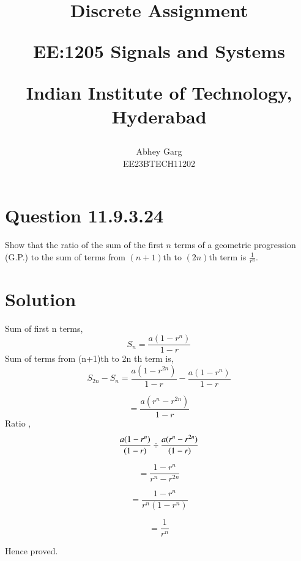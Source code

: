 \documentclass[journal,12pt,twocolumn]{IEEEtran}
\theoremstyle{remark}
\begin{document}
%




\vspace{3cm}

\title{
Discrete Assignment 

\large{EE:1205 Signals and Systems}

Indian Institute of Technology, Hyderabad
}
\author{Abhey Garg

EE23BTECH11202
}	


\maketitle

\newpage


\bigskip

\renewcommand{\thefigure}{\theenumi}
\renewcommand{\thetable}{\theenumi}

\section{Question 11.9.3.24}
Show that the ratio of the sum of the first \(n\) terms of a geometric progression (G.P.) to the sum of terms from \((n+1)\)th to \((2n)\)th term is \(\frac{1}{r^n}\).
\section{Solution}

Sum of first n terms,
\begin{equation}
S_n = \frac{a(1 - r^n)}{1 - r}
\end{equation}
Sum of terms from (n+1)th to 2n th term is,
\begin{equation}
S_{2n} - S_n = \frac{a(1 - r^{2n})}{1 - r} - \frac{a(1 - r^n)}{1 - r}
\end{equation}

\begin{equation}
= \frac{a(r^n - r^{2n})}{1 - r}
\end{equation}
Ratio , 
\begin{equation}
\frac{a(1 - r^n)}{(1 - r)} \\
\div \\
\frac{a(r^n - r^{2n})}{(1 - r)}
\end{equation}

\begin{equation}
= \frac{1 - r^n}{r^n - r^{2n}}
\end{equation}

\begin{equation}
= \frac{1 - r^n}{{r^n}({1 - r^n})}
\end{equation}

\begin{equation}
= \frac{1}{r^n}
\end{equation}

Hence proved.

	
\end{document}
